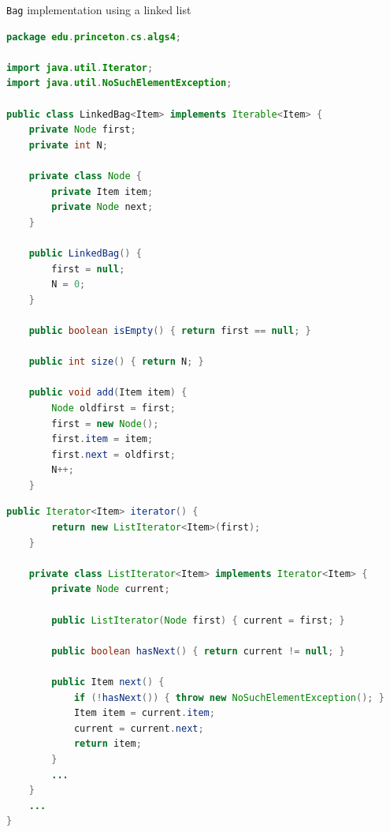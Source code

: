 \documentclass[8pt,a4paper,compress]{beamer}
\begin{document}
\begin{frame}[fragile]
\lstinline{Bag} implementation using a linked list
\begin{lstlisting}[language=Java]
package edu.princeton.cs.algs4;

import java.util.Iterator;
import java.util.NoSuchElementException;

public class LinkedBag<Item> implements Iterable<Item> {
    private Node first;
    private int N;

    private class Node {
        private Item item;
        private Node next;
    }

    public LinkedBag() {
        first = null;
        N = 0;
    }

    public boolean isEmpty() { return first == null; }

    public int size() { return N; }

    public void add(Item item) {
        Node oldfirst = first;
        first = new Node();
        first.item = item;
        first.next = oldfirst;
        N++;
    }
\end{lstlisting}
\end{frame}

\begin{frame}[fragile]
\begin{lstlisting}[language=Java]
    public Iterator<Item> iterator() { 
        return new ListIterator<Item>(first); 
    }

    private class ListIterator<Item> implements Iterator<Item> {
        private Node current;

        public ListIterator(Node first) { current = first; }

        public boolean hasNext() { return current != null; }

        public Item next() {
            if (!hasNext()) { throw new NoSuchElementException(); }
            Item item = current.item;
            current = current.next; 
            return item;
        }
        ...
    }
    ...
}
\end{lstlisting}
\end{frame}
\end{document}
